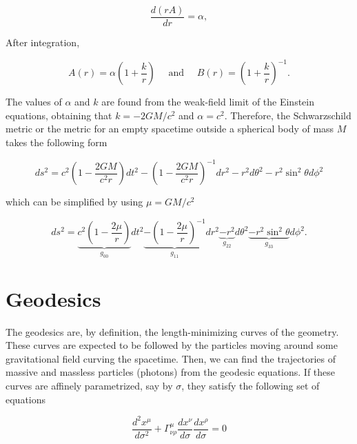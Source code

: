 \documentclass[letterpaper,11pt,onecolumn]{article}
\begin{document}
 \begin{equation}
\frac{d(r A)}{d r}=\alpha, \nonumber
\end{equation}

After integration,

\begin{equation}
A(r)=\alpha\left(1+\frac{k}{r}\right) \quad \text { and } \quad B(r)=\left(1+\frac{k}{r}\right)^{-1}. \nonumber
\end{equation}

The values of $\alpha$ and $k$ are found from the weak-field limit of the Einstein equations, obtaining that $k=-2 G M / c^{2}$ and $\alpha=c^{2}$. Therefore, the Schwarzschild metric or the metric for an empty spacetime outside a spherical body of mass $M$ takes the following form

\begin{equation}
d s^{2}=c^{2}\left(1-\frac{2 G M}{c^{2} r}\right) d t^{2}-\left(1-\frac{2 G M}{c^{2} r}\right)^{-1} d r^{2}-r^{2} d \theta^{2}-r^{2} \sin ^{2} \theta d \phi^{2}\nonumber
\end{equation}

which can be simplified by using $\mu=GM/c^2$

\begin{equation}
d s^{2}=\underbrace{c^{2}\left(1-\frac{2 \mu}{r}\right)}_{\textstyle g_{00}} d t^{2} \underbrace{-\left(1-\frac{2 \mu}{r}\right)^{-1}}_{\textstyle g_{11}} d r^{2}\underbrace{-r^{2}}_{\textstyle g_{22}} d \theta^{2}\underbrace{-r^{2} \sin ^{2}\theta}_{\textstyle g_{33}}  d \phi^{2}.
\label{metric}
\end{equation}


\section{Geodesics}


The geodesics are, by definition, the length-minimizing curves of the geometry. These curves are expected to be followed by the particles moving around some gravitational field curving the spacetime. Then, we can find the trajectories of massive and massless particles (photons) from the geodesic equations. If these curves are affinely parametrized, say by $\sigma$, they satisfy the following set of equations

\begin{equation}
    \frac{d^2 x^\mu}{d\sigma^2} + \Gamma^{\mu}_{\nu \rho} \frac{dx^\nu}{d\sigma} \frac{dx^\rho}{d\sigma} = 0
\end{equation}
\end{document}

